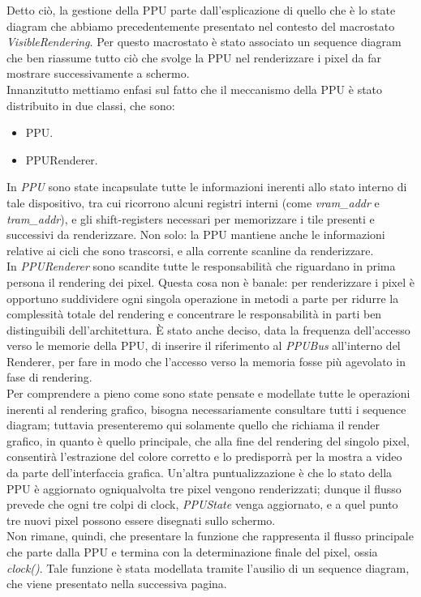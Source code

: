 \documentclass[11pt]{article}
\begin{document}
Detto ciò, la gestione della PPU parte dall'esplicazione di quello che è lo state diagram che abbiamo precedentemente presentato nel contesto del macrostato \emph{VisibleRendering}. Per questo macrostato è stato associato un sequence diagram che ben riassume tutto ciò che svolge la PPU nel renderizzare i pixel da far mostrare successivamente a schermo.\\
Innanzitutto mettiamo enfasi sul fatto che il meccanismo della PPU è stato distribuito in due classi, che sono:
\begin{itemize}
	\item{
		PPU.
	}
	\item{
		PPURenderer.
	}
\end{itemize}
In \emph{PPU} sono state incapsulate tutte le informazioni inerenti allo stato interno di tale dispositivo, tra cui ricorrono alcuni registri interni (come \emph{vram\_addr} e \emph{tram\_addr}), e gli shift-registers necessari per memorizzare i tile presenti e successivi da renderizzare. Non solo: la PPU mantiene anche le informazioni relative ai cicli che sono trascorsi, e alla corrente scanline da renderizzare.\\
In \emph{PPURenderer} sono scandite tutte le responsabilità che riguardano in prima persona il rendering dei pixel. Questa cosa non è banale: per renderizzare i pixel è opportuno suddividere ogni singola operazione in metodi a parte per ridurre la complessità totale del rendering e concentrare le responsabilità in parti ben distinguibili dell'architettura. È stato anche deciso, data la frequenza dell'accesso verso le memorie della PPU, di inserire il riferimento al \emph{PPUBus} all'interno del Renderer, per fare in modo che l'accesso verso la memoria fosse più agevolato in fase di rendering.\\
Per comprendere a pieno come sono state pensate e modellate tutte le operazioni inerenti al rendering grafico, bisogna necessariamente consultare tutti i sequence diagram; tuttavia presenteremo qui solamente quello che richiama il render grafico, in quanto è quello principale, che alla fine del rendering del singolo pixel, consentirà l'estrazione del colore corretto e lo predisporrà per la mostra a video da parte dell'interfaccia grafica. Un'altra puntualizzazione è che lo stato della PPU è aggiornato ogniqualvolta tre pixel vengono renderizzati; dunque il flusso prevede che ogni tre colpi di clock, \emph{PPUState} venga aggiornato, e a quel punto tre nuovi pixel possono essere disegnati sullo schermo.\\
Non rimane, quindi, che presentare la funzione che rappresenta il flusso principale che parte dalla PPU e termina con la determinazione finale del pixel, ossia \emph{clock()}. Tale funzione è stata modellata tramite l'ausilio di un sequence diagram, che viene presentato nella successiva pagina.
\end{document}
